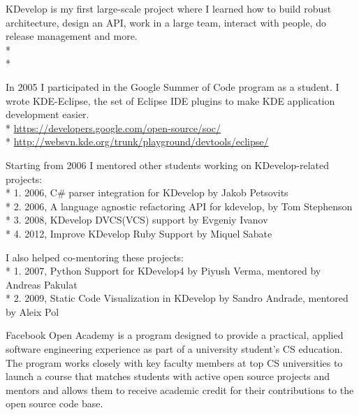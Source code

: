 \documentclass[12pt]{letter}
\begin{document}
\begin{llist}
            \item KDevelop is my first large-scale project where I learned how to build robust architecture, design an API, work in a large team, interact with people, do release management and more.\\*
            \\*

  \endexperience

  \location{}

  \startexperience

           \item In 2005 I participated in the Google Summer of Code program as a student. I wrote KDE-Eclipse, the set of Eclipse IDE plugins to make KDE application development easier.\\*
                \url{https://developers.google.com/open-source/soc/}\\*
                \url{http://websvn.kde.org/trunk/playground/devtools/eclipse/}

           \item Starting from 2006 I mentored other students working on KDevelop-related projects:\\*
                  1. 2006, C\# parser \/ integration for KDevelop by Jakob Petsovits\\*
                  2. 2006, A language agnostic refactoring API for kdevelop, by Tom Stephenson\\*
                  3. 2008, KDevelop DVCS(VCS) support by Evgeniy Ivanov\\*
                  4. 2012, Improve KDevelop Ruby Support by Miquel Sabate

            \item I also helped co-mentoring these projects:\\*
                  1. 2007, Python Support for KDevelop4 by Piyush Verma, mentored by Andreas Pakulat\\*
                  2. 2009, Static Code Visualization in KDevelop by Sandro Andrade, mentored by Aleix Pol

  \endexperience

  \location{}

  \startexperience

           \item Facebook Open Academy is a program designed to provide a practical, applied software engineering experience as part of a university student’s CS education. The program works closely with key faculty members at top CS universities to launch a course that matches students with active open source projects and mentors and allows them to receive academic credit for their contributions to the open source code base.


\end{llist}
\end{document}
